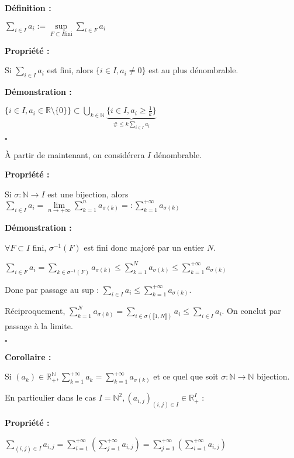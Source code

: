 \documentclass[10pt,a4paper,notitlepage ]{report}
\newcommand{\1}{\mathds 1}
\newenvironment{definition}[1][]{
	
	\textbf{Définition #1 : }
}
{}
\newcounter{th}
\newenvironment{propriete}[1][]{
	\begin{tcolorbox}
		\textbf{Propriété #1 : }
}
{\end{tcolorbox}}
\newenvironment{demo}[1][]{

	\textbf{Démonstration #1 :}
}{\begin{flushright}
	$\square$
\end{flushright}
}
\newenvironment{corollaire}{
	\begin{tcolorbox}
		\textbf{Corollaire : }
	}
	{\end{tcolorbox}}
\begin{document}
\begin{definition}
	$\sum_{i \in I} a_i := \underset{F \subset I \mathrm{fini}}{\sup}\sum_{i \in F}a_i$
\end{definition}
\begin{propriete}
	Si $\sum_{i \in I} a_i$ est fini, alors $\{i \in I, a_i\neq 0\}$ est au plus dénombrable.
\end{propriete}

\begin{demo}
	$\{i\in I, a_i \in \mathbb R \setminus \{0\}\} \subset \underset{k \in \mathbb N}{\bigcup}
	\underset{\# \le k\sum_{i\in I} a_i}{\underbrace{\{i \in I, a_i \ge \frac{1}{k}\}}}$
\end{demo}

À partir de maintenant, on considérera $I$ dénombrable.

\begin{propriete}
	Si $\sigma : \mathbb N \rightarrow I$ est une bijection, alors
	$\sum_{i\in I}a_i = \underset{n \rightarrow +\infty}{\lim}\sum_{k=1}^{n}a_{\sigma (k)} =: \sum_{k=1}^{+\infty}a_{\sigma(k)}$
\end{propriete}

\begin{demo}
	$\forall F \subset I$ fini, $\sigma ^{-1}(F)$ est fini donc majoré par un entier $N$.
	
	$\sum_{i\in F}a_i = \sum_{k\in \sigma^{-1}(F)}a_{\sigma(k)} \le \sum_{k=1}^N a_{\sigma(k)} \le \sum_{k=1}^{+\infty}a_{\sigma(k)}$
	
	Donc par passage au sup : $\sum_{i\in I} a_i \le \sum_{k=1}^{+\infty}a_{\sigma(k)}$.
	
	Réciproquement, $\sum_{k=1}^N a_{\sigma(k)} = \sum_{i\in\sigma(\llbracket 1,N \rrbracket)} a_i \le \sum_{i\in I}a_i$. On conclut par passage à la limite.
\end{demo}

\begin{corollaire}
	Si $(a_k) \in \mathbb R_+^{\mathbb N}, \sum_{k=1}^{+\infty}a_k=\sum_{k=1}^{+\infty}a_{\sigma(k)}$ et ce quel que soit $\sigma : \mathbb N \rightarrow \mathbb N$ bijection.
\end{corollaire}

En particulier dans le cas $I=\mathbb N^2, (a_{i,j})_{(i,j)\in I}\in \mathbb R_+^I$ :
\begin{propriete}
	$\sum_{(i,j)\in I}a_{i,j} = \sum_{i=1}^{+\infty}\left(\sum_{j=1}^{+\infty}a_{i,j}\right) =
	\sum_{j=1}^{+\infty}\left(\sum_{i=1}^{+\infty}a_{i,j}\right)$
\end{propriete}
\end{document}
